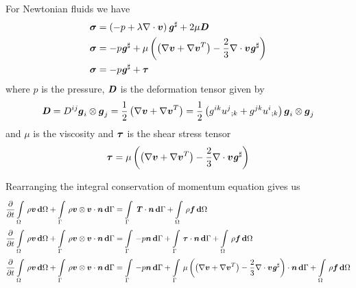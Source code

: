 For Newtonian fluids we have
\begin{equation}
  \begin{split}
    \tensor{\sigma}&=\pbrac{-p+\lambda\divergence{}{\vectr{v}}}\sharptensor{\tensor{g}}+2\mu\tensor{D} \\
    \tensor{\sigma}&=-p\sharptensor{\tensor{g}}+\mu\pbrac{\pbrac{\gradient{}{\vectr{v}}+\transpose{\gradient{}{\vectr{v}}}}-
      \frac{2}{3}\divergence{}{\vectr{v}}\sharptensor{\tensor{g}}}\\
    \tensor{\sigma}&=-p\sharptensor{\tensor{g}}+\tensor{\tau}
  \end{split}
\end{equation}
where $p$ is the pressure, $\boldsymbol{\mathit{D}}$ is the deformation tensor given by
\begin{equation}
  \tensor{D}=D^{ij}\tensorprod{\vectr{g}_{i}}{\vectr{g}_{j}}=\frac{1}{2}\pbrac{\gradient{}{\vectr{v}}+\transpose{\gradient{}{\vectr{v}}}}=\frac{1}{2}\pbrac{g^{ik}\covarderiv{u^{j}}{k}+g^{jk}\covarderiv{u^{i}}{k}}\tensorprod{\vectr{g}_{i}}{\vectr{g}_{j}}
\end{equation}
and $\mu$ is the viscosity and $\boldsymbol{\mathit{\tau}}$ is the shear stress tensor \ie
\begin{equation}
  \tensor{\tau}=\mu\pbrac{\pbrac{\gradient{}{\vectr{v}}+\transpose{\gradient{}{\vectr{v}}}}-
    \frac{2}{3}\divergence{}{\vectr{v}}\sharptensor{\tensor{g}}}
\end{equation}

Rearranging the integral conservation of momentum equation gives us
\begin{equation}
  \begin{split}
    \delby{}{t}\gint{\Omega}{}{\rho\vectr{v}}{\Omega}
    +\gint{\Gamma}{}{\dotprod{\tensorprod{\rho\vectr{v}}{\vectr{v}}}{\vectr{n}}}{\Gamma}
    &=\gint{\Gamma}{}{\dotprod{\tensor{T}}{\vectr{n}}}{\Gamma}+\gint{\Omega}{}{\rho\vectr{f}}{\Omega}\\ \delby{}{t}\gint{\Omega}{}{\rho\vectr{v}}{\Omega}
    +\gint{\Gamma}{}{\dotprod{\tensorprod{\rho\vectr{v}}{\vectr{v}}}{\vectr{n}}}{\Gamma}
    &=\gint{\Gamma}{}{-p\vectr{n}}{\Gamma}+\gint{\Gamma}{}{\dotprod{\tensor{\tau}}{\vectr{n}}}{\Gamma}
    +\gint{\Omega}{}{\rho\vectr{f}}{\Omega}
    \\ \delby{}{t}\gint{\Omega}{}{\rho\vectr{v}}{\Omega}
    +\gint{\Gamma}{}{\dotprod{\tensorprod{\rho\vectr{v}}{\vectr{v}}}{\vectr{n}}}{\Gamma}
    &=\gint{\Gamma}{}{-p\vectr{n}}{\Gamma}+\gint{\Gamma}{}{\dotprod{\mu\pbrac{\pbrac{\gradient{}{\vectr{v}}
            +\transpose{\gradient{}{\vectr{v}}}}-\frac{2}{3}\divergence{}{\vectr{v}}
          \sharptensor{\tensor{g}}}}{\vectr{n}}}{\Gamma}+\gint{\Omega}{}{\rho\vectr{f}}{\Omega}
    \\
  \end{split}
  \label{eqn:integralconservationofmomentum}
\end{equation}

